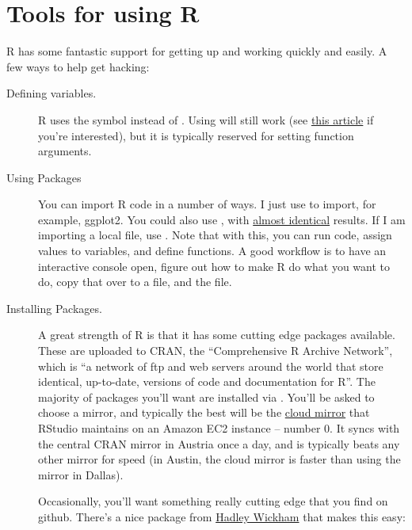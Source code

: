 \section{Tools for using R}

R has some fantastic support for getting up and working quickly and easily.  A 
few ways to help get hacking:

\begin{description}
\item[Defining variables.] R uses the symbol \code{<-} instead of \code{=}.  
  Using \code{=} will still work (see 
  \href{http://blog.revolutionanalytics.com/2008/12/use-equals-or-arrow-for-assignment.html}{this article}
  if you're interested), but it is typically reserved for setting function
  arguments.
\item[Using Packages]  You can import R code in a number of ways.  I just use
   to import, for example, ggplot2.  You could also use
  , with 
  \href{http://stackoverflow.com/questions/5595512/what-is-the-difference-between-require-and-library}{almost identical}
  results.  If I am importing a local file, use 
  .  Note that with this, you can run
  code, assign values to variables, and define functions.  A good workflow
  is to have an interactive console open, figure out how to make R do what
  you want to do, copy that over to a file, and  the file.
\item[Installing Packages.] A great strength of R is that it has some cutting
  edge packages available.  These are uploaded to CRAN, the ``Comprehensive
  R Archive Network'', which is ``a network of ftp and web servers around the 
  world that store identical, up-to-date, versions of code and documentation for
  R''.  The majority of packages you'll want are installed
  via .  You'll be asked to choose a mirror, 
  and typically the best will be the 
  \href{http://blog.rstudio.org/2013/06/10/rstudio-cran-mirror/}{cloud mirror}
  that RStudio maintains on an Amazon EC2 instance -- number 0.  It syncs
  with the central CRAN mirror in Austria once a day, and is typically beats
  any other mirror for speed (in Austin, the cloud mirror is faster than using
  the mirror in Dallas). 

  Occasionally, you'll want something really cutting edge that you find on 
  github.  There's a nice package from 
  \href{had.co.nz}{Hadley Wickham} that makes this easy:


\end{description}
